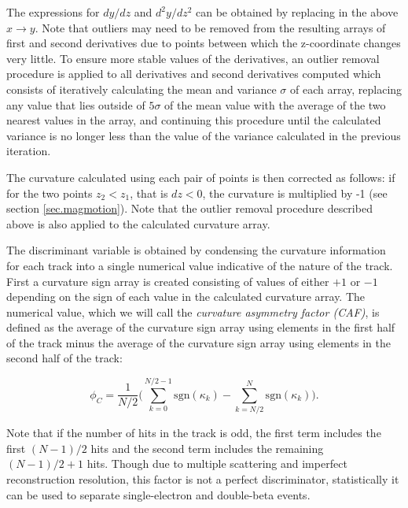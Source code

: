 \documentclass{JINST}
\begin{document}
The expressions for $dy/dz$ and $d^2y/dz^2$ can be obtained by replacing in the above $x \rightarrow y$.  Note that outliers may need to be removed from the resulting arrays of first and second derivatives due to points between which the z-coordinate changes very little.  To ensure more stable values of the derivatives, an outlier removal procedure is applied to all derivatives and second derivatives computed which consists of iteratively calculating the mean and variance $\sigma$ of each array, replacing any value that lies outside of $5\sigma$ of the mean value with the average of the two nearest values in the array, and continuing this procedure until the calculated variance is no longer less than the value of the variance calculated in the previous iteration. %

The curvature calculated using each pair of points is then corrected as follows: if for the two points $z_2 < z_1$, that is 
$dz < 0$, the curvature is multiplied by -1 (see section \ref{sec.magmotion}).  Note that the outlier removal procedure described above is also applied to the calculated curvature array.  

The discriminant variable is obtained by condensing the curvature information for each track into a single numerical value indicative of the nature of the track.  First a curvature sign array is created 
consisting of values of either $+1$ or $-1$ depending on the sign of each value in the calculated curvature array.  The 
numerical value, which we will
call the {\em curvature asymmetry factor (CAF)}, is defined as the average of the curvature sign array using elements in the first half of 
the track minus the average of the curvature sign array using elements in the second half of the track:

\begin{equation}\label{eqn_assym}
\phi_{C} = \frac{1}{N/2}\Biggl(\sum_{k=0}^{N/2-1}\mathrm{sgn}(\kappa_{k}) - \sum_{k=N/2}^{N}\mathrm{sgn}(\kappa_{k})\Biggr).
\end{equation}

\noindent Note that if the number of hits in the track is odd, the first term includes the first $(N-1)/2$ hits and
the second term includes the remaining $(N-1)/2 + 1$ hits.  Though due to multiple scattering and imperfect
reconstruction resolution, this factor is not a perfect discriminator, statistically it can be used to separate 
single-electron and double-beta events.
\end{document}

